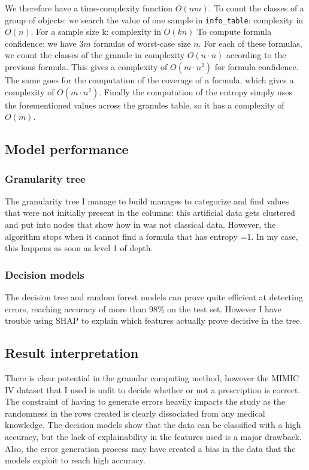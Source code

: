 \documentclass[a4paper,12pt]{article}
\begin{document}
We therefore have a time-complexity function $O(nm)$.
To count the classes of a group of objects: we search the value of one sample in \texttt{info_table}: complexity in $O(n)$. For a sample size k: complexity in $O(kn)$ 
To compute formula confidence: we have $3m$  formulas of worst-case size $n$. For each of these formulas, we count the classes of the granule in complexity $O(n\cdot n)$ according to the previous formula.
This gives a complexity of $O(m\cdot n^2)$ for formula confidence.
The same goes for the computation of the coverage of a formula, which gives a complexity of $O(m\cdot n^2)$.
Finally the computation of the entropy simply uses the forementioned values across the granules table, so it has a complexity of $O(m)$.



\subsection{Model performance}
\subsubsection{Granularity tree}
The granularity tree I manage to build manages to categorize and find values that were not initially present in the columns: this artificial data gets clustered and put into nodes that show how in was not classical data.
However, the algorithm stops when it cannot find a formula that has entropy =1. In my case, this happens as soon as level 1 of depth.

\subsubsection{Decision models}

The decision tree and random forest models can prove quite efficient at detecting errors,  reaching accuracy of more than 98\% on the test set. However I have trouble using SHAP to explain which features actually prove decisive in the tree.

\subsection{Result interpretation}
There is clear potential in the granular computing method, however the MIMIC IV dataset that I used is unfit to decide whether or not a prescription is correct. The constraint of having to generate errors heavily impacts the study as the randomness in the rows created is clearly dissociated from any medical knowledge.
The decision models show that the data can be classified with a high accuracy, but the lack of explainability in the features used is a major drawback. Also, the error generation process may have created a bias in the data that the models exploit to reach high accuracy. 
\end{document}
